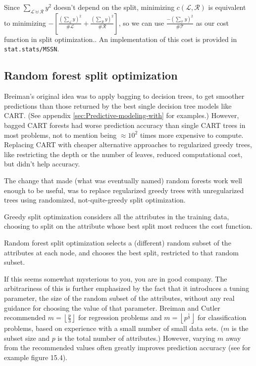 \documentclass[10pt,openany]{article}
\numberwithin{definition}{section}
\numberwithin{example}{section}
\numberwithin{equation}{section}
\numberwithin{figure}{section}
\begin{document}
Since $\sum_{\mathcal{L}\uplus\mathcal{R}}y^{2}$ doesn't depend on
the split, minimizing $c\left(\mathcal{L},\mathcal{R}\right)$ is
equivalent to minimizing $-\left[\frac{\left(\sum_{\mathcal{L}}y\right)^{2}}{\#\mathcal{L}}+\frac{\left(\sum_{\mathcal{R}}y\right)^{2}}{\#\mathcal{R}}\right]$,
so we can use $\frac{-\left(\sum_{\mathcal{T}}y\right)^{2}}{\#\mathcal{T}}$
as our cost function in split optimization.. An implementation of
this cost is provided in \texttt{stat.stats/MSSN}.

\subsection{Random forest split optimization}

Breiman's original idea was to apply bagging to decision trees, to
get smoother predictions than those returned by the best single decision
tree models like CART\cite{breiman-friedman-olshen-stone-1984}. (See
appendix \ref{sec:Predictive-modeling-with} for examples.) However,
bagged CART forests had worse prediction accuracy than single CART
trees in most problems, not to mention being $\approx10^{2}$ times
more expensive to compute. Replacing CART with cheaper alternative
approaches to regularized greedy trees, like restricting the depth
or the number of leaves, reduced computational cost, but didn't help
accuracy.

The change that made (what was eventually named) random forests work
well enough to be useful, was to replace regularized greedy trees
with unregularized trees using randomized, not-quite-greedy split
optimization. 

Greedy split optimization considers all the attributes in the training
data, choosing to split on the attribute whose best split most reduces
the cost function. 

Random forest split optimization selects a (different) random subset
of the attributes at each node, and chooses the best split, restricted
to that random subset. 

If this seems somewhat mysterious to you, you are in good company.
The arbitrariness of this is further emphasized by the fact that it
introduces a tuning parameter, the size of the random subset of the
attributes, without any real guidance for choosing the value of that
parameter. Breiman and Cutler recommended $m=\left\lfloor \frac{p}{3}\right\rfloor $
for regression problems and $m=\left\lfloor p^{\frac{1}{2}}\right\rfloor $
for classification problems, based on experience with a small number
of small data sets. ($m$ is the subset size and $p$ is the total
number of attributes.) However, varying $m$ away from the recommended
values often greatly improves prediction accuracy (see for example
\cite{hastie-tibshirani-friedman-2009} figure 15.4).
\end{document}
